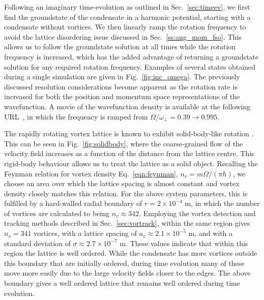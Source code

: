 Following an imaginary time-evolution as outlined in Sec.~\ref{sec:timeev}, we first find the groundstate of the condensate in a harmonic potential, starting with a condensate without vortices. We then linearly ramp the rotation frequency to avoid the lattice disordering issue discussed in Sec.~\ref{ss:ang_mom_fso}. This allows us to follow the groundstate solution at all times while the rotation frequency is increased, which has the added advantage of returning a groundstate solution for any required rotation frequency. Examples of several states obtained during a single simulation are given in Fig.~\ref{fig:inc_omega}. The previously discussed resolution considerations become apparent as the rotation rate is increased for both the position and momentum space representations of the wavefunction. A movie of the wavefunction density is available at the following URL~\cite{YT:BEC_gen}, in which the frequency is ramped from $\Omega/\omega_\perp = 0.39 \to 0.995$.

The rapidly rotating vortex lattice is known to exhibit solid-body-like rotation \cite{Vtx:AboShaeer_sci_2001}. This can be seen in Fig.~\ref{fig:solidbody}, where the coarse-grained flow of the velocity field increases as a function of the distance from the lattice centre. This rigid-body behaviour allows us to treat the lattice as a solid object. Recalling the Feynman relation for vortex density Eq.~\eqref{eqn:feynman}, $n_v = m\Omega/(\pi\hbar)$, we choose an area over which the lattice spacing is almost constant and vortex density closely matches this relation. For the above system parameters, this is fulfilled by a hard-walled radial boundary of $r=2\times 10^{-4}$ m, in which the number of vortices are calculated to being $n_v \approx 342$. Employing the vortex detection and tracking methods described in Sec.~\ref{sec:vortrack}, within the same region gives $n_v = 341$ vortices, with a lattice spacing of $a_v \approx 2.1\times 10^{-5}$ m, and with a standard deviation of $\sigma \approx 2.7 \times 10^{-7}$ m. These values indicate that within this region the lattice is well ordered. While the condensate has more vortices outside this boundary that are initially ordered, during time evolution many of these move more easily due to the large velocity fields closer to the edges. The above boundary gives a well ordered lattice that remains well ordered during time evolution.


